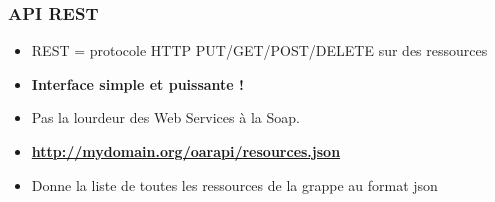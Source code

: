 \documentclass{beamer}
\begin{document}


\begin{frame}
  \frametitle{API REST}

  \begin{block}{}
    \begin{itemize}
      \item REST = protocole HTTP PUT/GET/POST/DELETE sur des ressources 
      \item {\bf Interface simple et puissante !}
      \item Pas la lourdeur des Web Services à la Soap.  
    \end{itemize}
  \end{block}

  \begin{block}{}
    \begin{itemize}
      \item {\bf  \url{http://mydomain.org/oarapi/resources.json} }
      \item  Donne la liste de toutes les ressources de la grappe au format json 
    \end{itemize}
  \end{block}


\end{frame}
\end{document}
